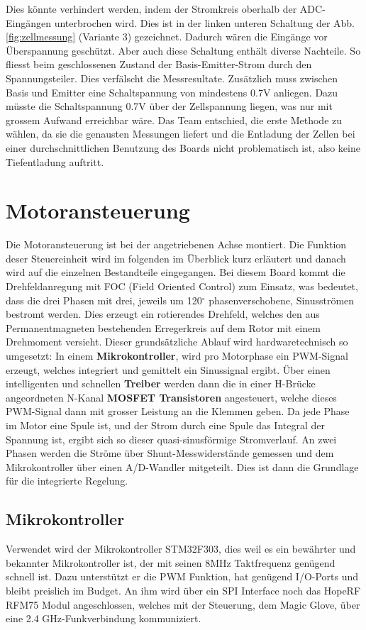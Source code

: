 Dies könnte verhindert werden, indem der Stromkreis oberhalb der ADC-Eingängen unterbrochen wird. Dies ist in der linken unteren Schaltung der Abb.\ref{fig:zellmessung} (Variante 3) gezeichnet. Dadurch wären die Eingänge vor Überspannung geschützt. Aber auch diese Schaltung enthält diverse Nachteile. So fliesst beim geschlossenen Zustand der Basis-Emitter-Strom durch den Spannungsteiler. Dies verfälscht die Messresultate. Zusätzlich muss zwischen Basis und Emitter eine Schaltspannung von mindestens 0.7V anliegen. Dazu müsste die Schaltspannung 0.7V über der Zellspannung liegen, was nur mit grossem Aufwand erreichbar wäre. 
Das Team entschied, die erste Methode zu wählen, da sie die genausten Messungen liefert und die Entladung der Zellen bei einer durchschnittlichen Benutzung des Boards nicht problematisch ist, also keine Tiefentladung auftritt.

\section{Motoransteuerung}
\label{HW_Motoransteuerung}
Die Motoransteuerung ist bei der angetriebenen Achse montiert. Die Funktion deser Steuereinheit wird im folgenden im Überblick kurz erläutert und danach wird auf die einzelnen Bestandteile eingegangen.
Bei diesem Board kommt die Drehfeldanregung mit FOC (Field Oriented Control) zum Einsatz, was bedeutet, dass die drei Phasen mit drei, jeweils um 120\(^\circ\) phasenverschobene, Sinusströmen bestromt werden. Dies erzeugt ein rotierendes Drehfeld, welches den aus Permanentmagneten bestehenden Erregerkreis auf dem Rotor mit einem Drehmoment versieht. Dieser grundsätzliche Ablauf wird hardwaretechnisch so umgesetzt:
In einem \textbf{Mikrokontroller}, wird pro Motorphase ein PWM-Signal erzeugt, welches integriert und gemittelt ein Sinussignal ergibt. Über einen intelligenten und schnellen \textbf{Treiber} werden dann die in einer H-Brücke angeordneten N-Kanal \textbf{MOSFET Transistoren} angesteuert, welche dieses PWM-Signal dann mit grosser Leistung an die Klemmen geben. Da jede Phase im Motor eine Spule ist, und der Strom durch eine Spule das Integral der Spannung ist, ergibt sich so dieser quasi-sinusförmige Stromverlauf.
An zwei Phasen werden die Ströme über Shunt-Messwiderstände gemessen und dem Mikrokontroller über einen A/D-Wandler mitgeteilt. Dies ist dann die Grundlage für die integrierte Regelung.

\subsection*{Mikrokontroller}
Verwendet wird der Mikrokontroller STM32F303, dies weil es ein bewährter und bekannter Mikrokontroller ist, der mit seinen 8MHz Taktfrequenz genügend schnell ist. Dazu unterstützt er die PWM Funktion, hat genügend I/O-Ports und bleibt preislich im Budget.
An ihm wird über ein SPI Interface noch das HopeRF RFM75 Modul angeschlossen, welches mit der Steuerung, dem Magic Glove, über eine 2.4 GHz-Funkverbindung kommuniziert.

